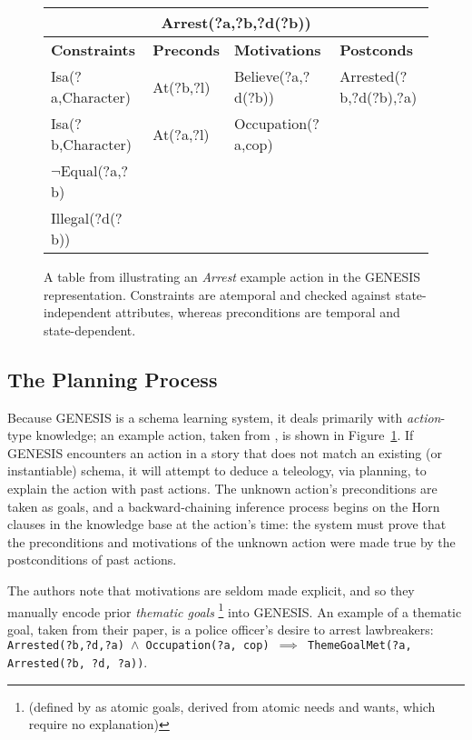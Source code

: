 \begin{figure}
\begin{tabular}{ |p{3cm}|p{2cm}|p{3.5cm}|p{4cm}|  }
 \hline
 \multicolumn{4}{|c|}{\textbf{Arrest(?a,?b,?d(?b))}} \\
 \hline
 \textbf{Constraints}&\textbf{Preconds}&\textbf{Motivations}&\textbf{Postconds}\\
 \hline
Isa(?a,Character)&At(?b,?l)&Believe(?a,?d(?b))&Arrested(?b,?d(?b),?a)\\
Isa(?b,Character)&At(?a,?l)&Occupation(?a,cop)&\\
$\lnot$Equal(?a,?b)&&&\\
Illegal(?d(?b))&&&\\
 \hline
\end{tabular}
\caption{A table from \citep{mooney90} illustrating an \textit{Arrest} example action in the GENESIS representation. Constraints are atemporal and checked against state-independent attributes, whereas preconditions are temporal and state-dependent.}
\label{fig:genesisaction}
\end{figure}

\subsection{The Planning Process}

Because GENESIS is a schema learning system, it deals primarily with \textit{action}-type knowledge; an example action, taken from \citep{mooney90}, is shown in Figure~\ref{fig:genesisaction}. If GENESIS encounters an action in a story that does not match an existing (or instantiable) schema, it will attempt to deduce a teleology, via planning, to explain the action with past actions. The unknown action's preconditions are taken as goals, and a backward-chaining inference process begins on the Horn clauses in the knowledge base at the action's time: the system must prove that the preconditions and motivations of the unknown action were made true by the postconditions of past actions.

The authors note that motivations are seldom made explicit, and so they manually encode prior \textit{thematic goals} \footnote{(defined by \citep{schankandabelson} as atomic goals, derived from atomic needs and wants, which require no explanation)} into GENESIS. An example of a thematic goal, taken from their paper, is a police officer's desire to arrest lawbreakers: \texttt{Arrested(?b,?d,?a) $\land$ Occupation(?a, cop) $\implies$ ThemeGoalMet(?a, Arrested(?b, ?d, ?a))}.

